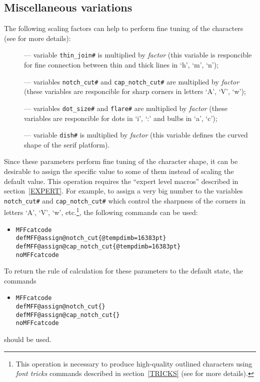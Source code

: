 \subsection{Miscellaneous variations\label{MISC}}

The following scaling factors can help to perform fine tuning
of the characters (see \cite{CM} for more details):
\begin{description}
\item[]
---  variable {\tt thin\_join\#} is multiplied by {\em factor}
     (this variable is responcible
     for fine connection between thin and thick lines in `h', `m', `n');
\item[] ---
     variables {\tt notch\_cut\#} and {\tt cap\_notch\_cut\#} are
     multiplied by {\em factor} (these variables
     are responcible for sharp corners in letters `A', `V', `w');
\item[] ---
     variables {\tt dot\_size\#} and {\tt flare\#} are multiplied
     by {\em factor} (these variables
     are responcible for dots in `i', `:' and bulbs in `a', `c');
\item[] ---
     variable {\tt dish\#} is multiplied by {\em factor} (this
     variable defines the curved shape of the serif platform).
\end{description}

Since these parameters perform fine tuning of the character shape,
it can be desirable to assign the specific value to some of them
instead of scaling the default value.
This operation requires the ``expert level macros''
described in section~\ref{EXPERT}.
For example, to assign a very big number to the variables
{\tt notch\_cut\#} and {\tt cap\_notch\_cut\#}
which control the sharpness of the corners in letters `A', `V', `w',
etc.\footnote{This operation is necessary to produce high-quality
outlined characters using {\em font tricks} commands described
in section~\ref{TRICKS} (see \cite{Outline} for more
details).}, the following commands can be used:
\begin{itemize}
\item[]
    {\tt\bs{}MFFcatcode}\\
    {\tt \bs{}def\bs{}MFF@assign@notch\_cut\{\bs{}@tempdimb=16383pt\}}\\
    {\tt \bs{}def\bs{}MFF@assign@cap\_notch\_cut\{\bs{}@tempdimb=16383pt\}}\\
    {\tt\bs{}noMFFcatcode}
\end{itemize}
To return the rule of calculation for these parameters
to the default state, the commands
\begin{itemize}
\item[]
    {\tt\bs{}MFFcatcode}\\
    {\tt \bs{}def\bs{}MFF@assign@notch\_cut\{\}}\\
    {\tt \bs{}def\bs{}MFF@assign@cap\_notch\_cut\{\}}\\
    {\tt\bs{}noMFFcatcode}
\end{itemize}
should be used.

